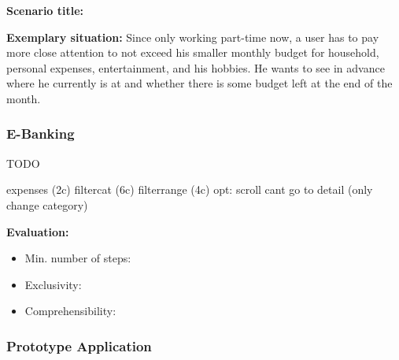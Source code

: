 \textbf{Scenario title:} \scenfour

\textbf{Exemplary situation:} Since only working part-time now, a user has to pay more close attention to not exceed his smaller monthly budget for household, personal expenses, entertainment, and his hobbies. He wants to see in advance where he currently is at and whether there is some budget left at the end of the month.



\subsubsection{E-Banking}

TODO

expenses (2c)
filtercat (6c)
filterrange (4c)
opt: scroll
cant go to detail (only change category)

\textbf{Evaluation:} 
\begin{itemize}[noitemsep,nolistsep]
	\item Min. number of steps: \textbf{}
	\item Exclusivity: \textbf{}
	\item Comprehensibility: \textbf{}
\end{itemize}



\subsubsection{Prototype Application}

